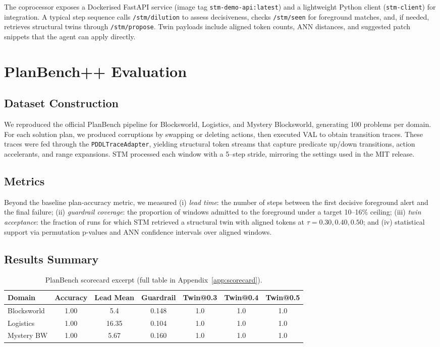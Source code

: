 \documentclass[11pt]{article}
\begin{document}
The coprocessor exposes a Dockerised FastAPI service (image tag \texttt{stm-demo-api:latest}) and a lightweight Python client (\texttt{stm-client}) for integration. A typical step sequence calls \texttt{/stm/dilution} to assess decisiveness, checks \texttt{/stm/seen} for foreground matches, and, if needed, retrieves structural twins through \texttt{/stm/propose}. Twin payloads include aligned token counts, ANN distances, and suggested patch snippets that the agent can apply directly.

\section{PlanBench++ Evaluation}
\subsection{Dataset Construction}
We reproduced the official PlanBench pipeline for Blocksworld, Logistics, and Mystery Blocksworld, generating 100 problems per domain. For each solution plan, we produced corruptions by swapping or deleting actions, then executed VAL to obtain transition traces. These traces were fed through the \texttt{PDDLTraceAdapter}, yielding structural token streams that capture predicate up/down transitions, action accelerants, and range expansions. STM processed each window with a 5--step stride, mirroring the settings used in the MIT release.

\subsection{Metrics}
Beyond the baseline plan-accuracy metric, we measured (i) \emph{lead time}: the number of steps between the first decisive foreground alert and the final failure; (ii) \emph{guardrail coverage}: the proportion of windows admitted to the foreground under a target 10--16\% ceiling; (iii) \emph{twin acceptance}: the fraction of runs for which STM retrieved a structural twin with aligned tokens at \(\tau=0.30,0.40,0.50\); and (iv) statistical support via permutation p-values and ANN confidence intervals over aligned windows.

\subsection{Results Summary}
\begin{table}[h]
  \centering
  \caption{PlanBench scorecard excerpt (full table in Appendix~\ref{app:scorecard}).}
  \label{tab:planbench-scorecard}
  \begin{tabular}{lcccccc}
    \toprule
    Domain & Accuracy & Lead Mean & Guardrail & Twin@0.3 & Twin@0.4 & Twin@0.5 \\
    \midrule
    Blocksworld & 1.00 & 5.4 & 0.148 & 1.0 & 1.0 & 1.0 \\
    Logistics & 1.00 & 16.35 & 0.104 & 1.0 & 1.0 & 1.0 \\
    Mystery BW & 1.00 & 5.67 & 0.160 & 1.0 & 1.0 & 1.0 \\
    \bottomrule
  \end{tabular}
\end{table}
\end{document}
